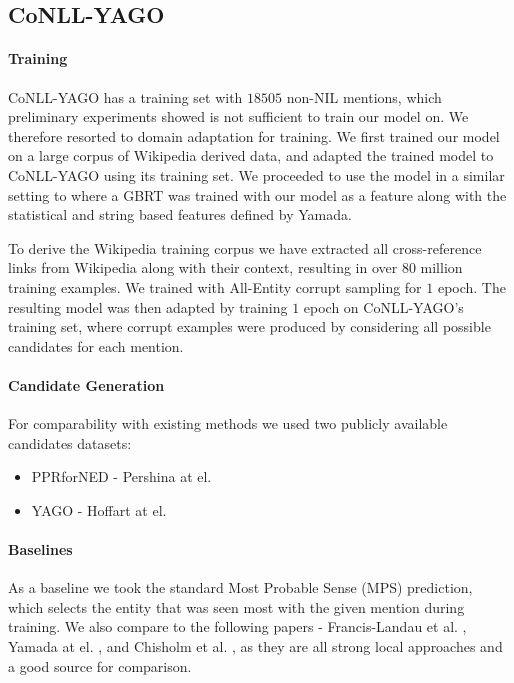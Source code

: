 \documentclass[11pt]{article}
\begin{document}
	\subsection{CoNLL-YAGO}
	\label{experiments-conll}
	
	\paragraph{Training}
	CoNLL-YAGO has a training set with $18505$ non-NIL mentions, which preliminary experiments showed is not sufficient to train our model on. We therefore resorted to domain adaptation for training. We first trained our model on a large corpus of Wikipedia derived data, and adapted the trained model to CoNLL-YAGO using its training set. We proceeded to use the model in a similar setting to  where a GBRT was trained with our model as a feature along with the statistical and string based features defined by Yamada. 
	
	To derive the Wikipedia training corpus we have extracted all cross-reference links from Wikipedia along with their context, resulting in over $80$ million training examples. We trained with All-Entity corrupt sampling for $1$ epoch. The resulting model was then adapted by training $1$ epoch on CoNLL-YAGO's training set, where corrupt examples were produced by considering all possible candidates for each mention.
	
	\paragraph{Candidate Generation}
	For comparability with existing methods we used two publicly available candidates datasets:
	\begin{itemize}
		\item PPRforNED - Pershina at el. 
		\item YAGO - Hoffart at el. 
	\end{itemize}
	
	\paragraph{Baselines}
	As a baseline we took the standard Most Probable Sense (MPS) prediction, which selects the entity that was seen most with the given mention during training.
	We also compare to the following papers - Francis-Landau et al. ,  Yamada at el. , and Chisholm et al. , as they are all strong local approaches and a good source for comparison.
	
\end{document}
